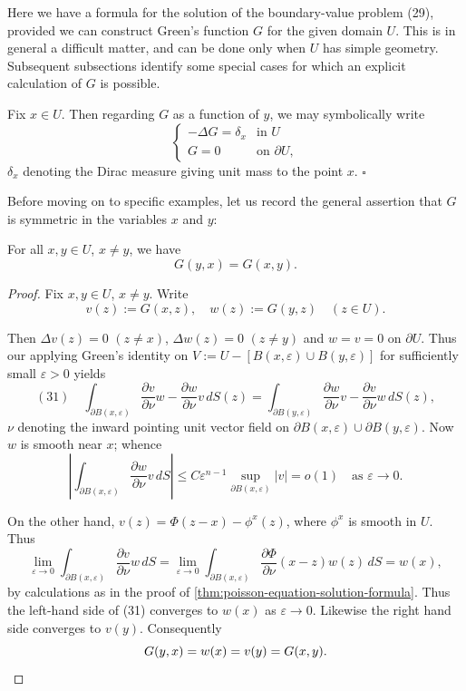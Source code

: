 Here we have a formula for the solution of the boundary-value problem (29), provided we can construct Green's function $G$ for the given domain $U$. This is in general a difficult matter, and can be done only when $U$ has simple geometry. Subsequent subsections identify some special cases for which an explicit calculation of $G$ is possible.

\begin{remark}
\label{rem:greens-function-dirac-delta}
Fix $x \in U$. Then regarding $G$ as a function of $y$, we may symbolically write
$$\begin{cases}
-\Delta G = \delta_x & \text{in } U \\
G = 0 & \text{on } \partial U,
\end{cases}$$
$\delta_x$ denoting the Dirac measure giving unit mass to the point $x$. $\square$
\end{remark}

Before moving on to specific examples, let us record the general assertion that $G$ is symmetric in the variables $x$ and $y$:

\begin{theorem}
\label{thm:greens-function-symmetry}
For all $x, y \in U$, $x \neq y$, we have
$$G(y,x) = G(x,y).$$
\end{theorem}

\begin{proof}
Fix $x,y \in U$, $x \neq y$. Write
$$v(z) := G(x,z), \quad w(z) := G(y,z) \quad (z \in U).$$

Then $\Delta v(z) = 0$ $(z \neq x)$, $\Delta w(z) = 0$ $(z \neq y)$ and $w = v = 0$ on $\partial U$. Thus our applying Green's identity on $V := U - [B(x,\varepsilon) \cup B(y,\varepsilon)]$ for sufficiently small $\varepsilon > 0$ yields
$$(31) \quad \int_{\partial B(x,\varepsilon)} \frac{\partial v}{\partial \nu}w - \frac{\partial w}{\partial \nu}v \, dS(z) = \int_{\partial B(y,\varepsilon)} \frac{\partial w}{\partial \nu}v - \frac{\partial v}{\partial \nu}w \, dS(z),$$
$\nu$ denoting the inward pointing unit vector field on $\partial B(x,\varepsilon) \cup \partial B(y,\varepsilon)$. Now $w$ is smooth near $x$; whence
$$\left|\int_{\partial B(x,\varepsilon)} \frac{\partial w}{\partial \nu}v \, dS\right| \leq C\varepsilon^{n-1} \sup_{\partial B(x,\varepsilon)} |v| = o(1) \quad \text{as } \varepsilon \to 0.$$

On the other hand, $v(z) = \Phi(z-x) - \phi^x(z)$, where $\phi^x$ is smooth in $U$. Thus
$$\lim_{\varepsilon \to 0} \int_{\partial B(x,\varepsilon)} \frac{\partial v}{\partial \nu}w \, dS = \lim_{\varepsilon \to 0} \int_{\partial B(x,\varepsilon)} \frac{\partial \Phi}{\partial \nu}(x-z)w(z) \, dS = w(x),$$
by calculations as in the proof of \cref{thm:poisson-equation-solution-formula}. Thus the left-hand side of (31) converges to $w(x)$ as $\varepsilon \to 0$. Likewise the right hand side converges to $v(y)$. Consequently
$$G(y,x) = w(x) = v(y) = G(x,y). \qedhere$$
\end{proof}

